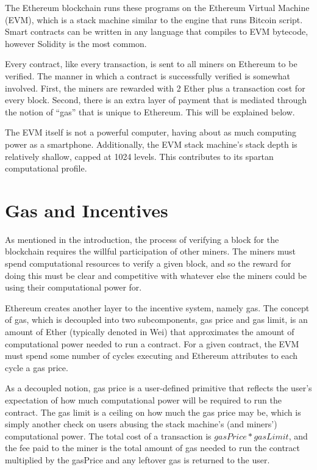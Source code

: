\documentclass[twoside]{article}
\begin{document}
The Ethereum blockchain runs these programs on the Ethereum Virtual Machine
(EVM), which is a stack machine similar to the engine that runs Bitcoin script.
Smart contracts can be written in any language that compiles to EVM bytecode,
however Solidity is the most common.

Every contract, like every transaction, is sent to all miners on Ethereum to be
verified.  The manner in which a contract is successfully verified is somewhat
involved.  First, the miners are rewarded with 2 Ether plus a transaction cost
for every block.  Second, there is an extra layer of payment that is mediated
through the notion of ``gas'' that is unique to Ethereum.  This will be
explained below.  

The EVM itself is not a powerful computer, having about as much computing power
as a smartphone.  Additionally, the EVM stack machine's stack depth is
relatively shallow, capped at 1024 levels.  This contributes to its spartan
computational profile.

\section{Gas and Incentives}

As mentioned in the introduction, the process of verifying a block for the
blockchain requires the willful participation of other miners.  The miners must
spend computational resources to verify a given block, and so the reward for
doing this must be clear and competitive with whatever else the miners could be
using their computational power for. 

Ethereum creates another layer to the incentive system, namely gas.  The concept
of gas, which is decoupled into two subcomponents, gas price and gas limit, is
an amount of Ether (typically denoted in Wei) that approximates the amount of
computational power needed to run a contract.  For a given contract, the EVM
must spend some number of cycles executing and Ethereum attributes to each cycle a
gas price.

As a decoupled notion, gas price is a user-defined primitive that reflects the
user's expectation of how much computational power will be required to run the
contract.  The gas limit is a ceiling on how much the gas price may be, which is
simply another check on users abusing the stack machine's (and miners')
computational power.  The total cost of a transaction is $gasPrice * gasLimit$,
and the fee paid to the miner is the total amount of gas needed to run the
contract multiplied by the gasPrice and any leftover gas is returned to the
user.
\end{document}
